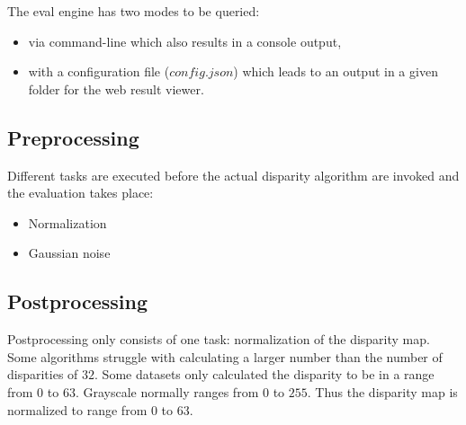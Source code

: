 \begin{center}
\end{center}

The eval engine has two modes to be queried:

\begin{itemize}
  \item via command-line which also results in a console output,
  \item with a configuration file ($config.json$) which leads to an output in a given folder for the web result viewer.
\end{itemize}

\subsection*{Preprocessing}

Different tasks are executed before the actual disparity algorithm are invoked and the evaluation takes place:

\begin{itemize}
  \item Normalization
  \item Gaussian noise
\end{itemize}

\subsection*{Postprocessing}

Postprocessing only consists of one task: normalization of the disparity map.
Some algorithms struggle with calculating a larger number than the number of disparities of $32$.
Some datasets only calculated the disparity to be in a range from $0$ to $63$.
Grayscale normally ranges from $0$ to $255$.
Thus the disparity map is normalized to range from $0$ to $63$.

